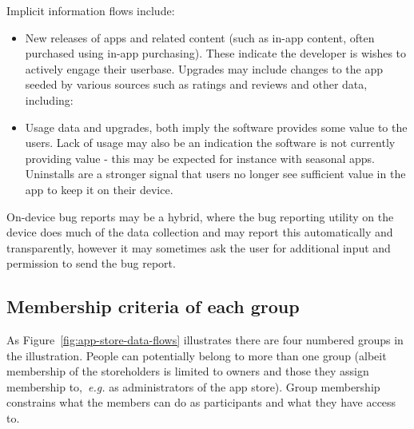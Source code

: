 
Implicit information flows include:
\begin{itemize}
    \item New releases of apps and related content (such as in-app content, often purchased using in-app purchasing). These indicate the developer is wishes to actively engage their userbase. Upgrades may include changes to the app seeded by various sources such as ratings and reviews and other data, including:
    \item Usage data and upgrades, both imply the software provides some value to the users. Lack of usage may also be an indication the software is not currently providing value - this may be expected for instance with seasonal apps. Uninstalls are a stronger signal that users no longer see sufficient value in the app to keep it on their device.
\end{itemize}

On-device bug reports may be a hybrid, where the bug reporting utility on the device does much of the data collection and may report this automatically and transparently, however it may sometimes ask the user for additional input and permission to send the bug report.

\subsection{Membership criteria of each group}
As Figure~\ref{fig:app-store-data-flows} illustrates there are four numbered groups in the illustration. People can potentially belong to more than one group (albeit membership of the storeholders is limited to owners and those they assign membership to,~\emph{e.g.} as administrators of the app store). Group membership constrains what the members can do as participants and what they have access to.

